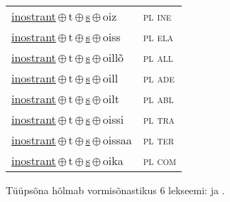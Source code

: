 \begin{minipage}{\textwidth}
\begin{sideways}
\begin{tabular}{l l}
\underline{inostrant}\,$\oplus$\,t\,$\oplus$\,\underline{s}\,$\oplus$\,oiz & \textsc{ pl ine } \\
\underline{inostrant}\,$\oplus$\,t\,$\oplus$\,\underline{s}\,$\oplus$\,oiss & \textsc{ pl ela } \\
\underline{inostrant}\,$\oplus$\,t\,$\oplus$\,\underline{s}\,$\oplus$\,oillõ & \textsc{ pl all } \\
\underline{inostrant}\,$\oplus$\,t\,$\oplus$\,\underline{s}\,$\oplus$\,oill & \textsc{ pl ade } \\
\underline{inostrant}\,$\oplus$\,t\,$\oplus$\,\underline{s}\,$\oplus$\,oilt & \textsc{ pl abl } \\
\underline{inostrant}\,$\oplus$\,t\,$\oplus$\,\underline{s}\,$\oplus$\,oissi & \textsc{ pl tra } \\
\underline{inostrant}\,$\oplus$\,t\,$\oplus$\,\underline{s}\,$\oplus$\,oissaa & \textsc{ pl ter } \\
\underline{inostrant}\,$\oplus$\,t\,$\oplus$\,\underline{s}\,$\oplus$\,oika & \textsc{ pl com } \\
\end{tabular}
\end{sideways}
\label{tab:tüüpsõnamall-inostranttsõ}

\end{minipage}

 
\vspace{1em}
\noindent Tüüpsõna hõlmab vormisõnastikus 6 lekseemi:  ja .
